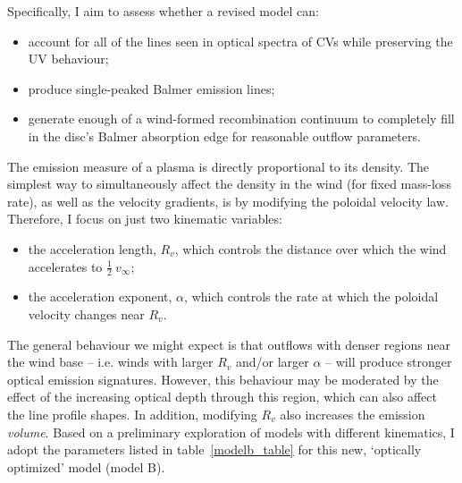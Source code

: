 Specifically, I aim to assess whether a revised model can:

\begin{itemize}
         \item account for all of the lines seen in optical spectra 
         of CVs while preserving
the UV behaviour;
         \item produce single-peaked Balmer emission lines; 
         \item generate enough of a wind-formed recombination continuum
to completely fill in the disc's Balmer absorption edge for 
reasonable outflow parameters.
\end{itemize} 

The emission measure of a plasma is directly proportional to its density.
The simplest way to simultaneously affect the density in the wind (for fixed mass-loss rate),
as well as the velocity gradients, is by modifying the poloidal velocity
law. Therefore, I focus on just two kinematic variables:

\begin{itemize}
         \item the acceleration length, $R_v$, which controls the
        distance over which the wind accelerates to $\frac{1}{2}~v_{\infty}$;
         \item the acceleration exponent, $\alpha$, which controls the rate 
         at which the poloidal velocity changes near $R_v$.
\end{itemize} 

The general behaviour we might expect is that outflows with denser
regions near the wind base -- i.e. winds with larger $R_{v}$ and/or
larger $\alpha$ -- will produce stronger optical emission signatures. 
However, this behaviour may be moderated by the effect of the increasing
optical depth through this region, which can also affect the line profile shapes. 
In addition, modifying $R_v$ also increases the emission {\em volume}.
Based on a preliminary exploration of models with different kinematics,
I adopt the parameters listed in table~\ref{modelb_table}
for this new, `optically optimized' model (model B). 




